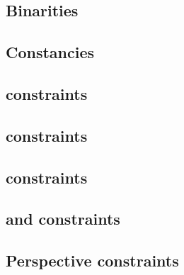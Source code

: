 \subsection{Binarities                                                                                \lispTodo{}}  \label{rlp auth: generalities: binarities}                                 
\subsection{Constancies                                                                               \lispTodo{}}  \label{rlp auth: generalities: constancies}                                
\subsection{\iomf{} constraints                                                                       \lispTodo{}}  \label{rlp auth: generalities: iomf}                                       
\subsection{\userTransactionNumber{}           constraints                                            \lispTodo{}}  \label{rlp auth: generalities: user transaction number}                    
\subsection{\rlpAuthMacroAuthorityTupleIndex{} constraints                                            \lispTodo{}}  \label{rlp auth: generalities: authority tuple index}                      
\subsection{\transactionTypeWithAuthorityLists{} and \transactionTypeWithAuthorityLists{} constraints \lispTodo{}}  \label{rlp auth: generalities: transactions with or sans authority list}   
\subsection{Perspective constraints                                                                   \lispTodo{}}  \label{rlp auth: generalities: perspectives}                               
